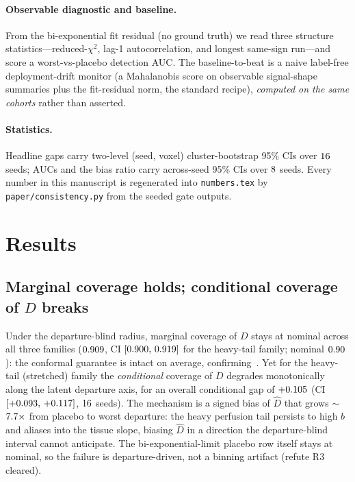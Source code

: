 \documentclass[11pt]{article}
\begin{document}
\paragraph{Observable diagnostic and baseline.} From the bi-exponential fit residual
(no ground truth) we read three structure statistics---reduced-$\chi^2$, lag-1
autocorrelation, and longest same-sign run---and score a worst-vs-placebo detection
AUC. The baseline-to-beat is a naive label-free deployment-drift monitor (a
Mahalanobis score on observable signal-shape summaries plus the fit-residual norm,
the standard recipe), \emph{computed on the same cohorts} rather than asserted.

\paragraph{Statistics.} Headline gaps carry two-level (seed, voxel) cluster-bootstrap
95\% CIs over $16$ seeds; AUCs and the bias ratio carry across-seed
95\% CIs over $8$ seeds. Every number in this manuscript is regenerated into
\texttt{numbers.tex} by \texttt{paper/consistency.py} from the seeded gate outputs.

\section{Results}

\subsection{Marginal coverage holds; conditional coverage of $D$ breaks}\label{sec:break}
Under the departure-blind radius, marginal coverage of $D$ stays at nominal across
all three families ($0.909$, CI $[0.900,\,0.919]$ for the heavy-tail
family; nominal $0.90$): the conformal guarantee is intact on average,
confirming~\citep{lei2018}. Yet for the heavy-tail (stretched) family the
\emph{conditional} coverage of $D$ degrades monotonically along the latent
departure axis, for an overall conditional gap of $+0.105$ (CI
$[+0.093,\,+0.117]$, $16$ seeds). The mechanism is a signed
bias of $\hat{D}$ that grows $\sim$\,$7.7\times$ from placebo to worst
departure: the heavy perfusion tail persists to high $b$ and aliases into the
tissue slope, biasing $\hat D$ in a direction the departure-blind interval cannot
anticipate. The bi-exponential-limit placebo row itself stays at nominal, so the
failure is departure-driven, not a binning artifact (refute R3 cleared).
\end{document}
